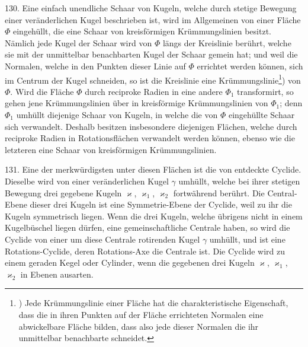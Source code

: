 \begin{center}
\makebox[15em]{\hrulefill}
\end{center}


\label{p15}


\hspace{\parindent}%
130. Eine einfach unendliche Schaar von Kugeln, welche
durch stetige Bewegung einer ver\"anderlichen Kugel beschrieben
ist, wird im Allgemeinen von einer Fl\"ache $\Phi$ eingeh\"ullt,
die eine Schaar von kreisf\"ormigen Kr\"ummungslinien besitzt.
N\"amlich jede Kugel der Schaar wird von $\Phi$ l\"angs der Kreislinie
ber\"uhrt, welche sie mit der unmittelbar benachbarten
Kugel der Schaar gemein hat; und weil die Normalen, welche
in den Punkten dieser Linie auf $\Phi$ errichtet werden k\"onnen,
sich im Centrum der Kugel schneiden, so ist die Kreislinie
eine Kr\"ummungslinie\footnote{) %
  Jede Kr\"ummungslinie einer Fl\"ache hat die charakteristische
  Eigenschaft, dass die in ihren Punkten auf der Fl\"ache errichteten Normalen
  eine abwickelbare Fl\"ache bilden, dass also jede dieser Normalen
  die ihr unmittelbar benachbarte schneidet.})
von $\Phi$. Wird die Fl\"ache $\Phi$ durch
reciproke Radien in eine andere $\Phi_1$ transformirt, so gehen
jene Kr\"ummungslinien \"uber in kreisf\"ormige Kr\"ummungslinien
von $\Phi_1$; denn $\Phi_1$ umh\"ullt diejenige Schaar von Kugeln, in
welche die von $\Phi$ eingeh\"ullte Schaar sich verwandelt. Deshalb
besitzen insbesondere diejenigen Fl\"achen, welche durch
reciproke Radien in Rotationsfl\"achen verwandelt werden
k\"onnen, ebenso wie die letzteren eine Schaar von kreisf\"ormigen
Kr\"ummungslinien.

131. Eine der merkw\"urdigsten unter diesen Fl\"achen
ist die von  entdeckte {\glqq}Cyclide{\grqq}. Dieselbe wird von
einer ver\"anderlichen Kugel $\gamma$ umh\"ullt, welche bei ihrer stetigen
Bewegung drei gegebene Kugeln $\varkappa$, $\varkappa_1$, $\varkappa_2$ fortw\"ahrend ber\"uhrt.
Die Central-Ebene dieser drei Kugeln ist eine Sym\-metrie-Ebene
der Cyclide, weil zu ihr die Kugeln symmetrisch liegen.
Wenn die drei Kugeln, welche \"ubrigens nicht in einem
Kugelb\"uschel liegen d\"urfen, eine gemeinschaftliche Centrale
haben, so wird die Cyclide von einer um diese Centrale
rotirenden Kugel $\gamma$ umh\"ullt, und ist eine Rotations-Cyclide,
deren Rotations-Axe die Centrale ist. Die Cyclide wird zu
einem geraden Kegel oder Cylinder, wenn die gegebenen drei
Kugeln $\varkappa$, $\varkappa_1$, $\varkappa_2$ in Ebenen ausarten.

